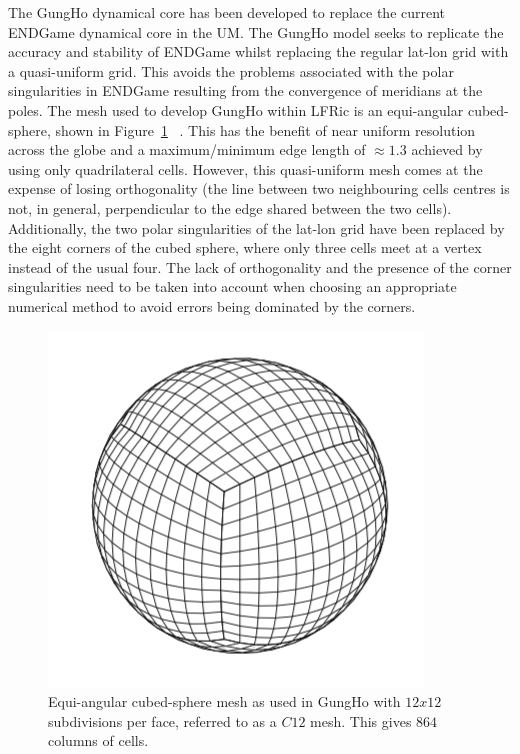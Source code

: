 \documentclass[review,times]{elsarticle}
\begin{document}
The GungHo dynamical core has been developed to replace the current ENDGame
dynamical core in the UM. The GungHo model seeks to replicate the
accuracy and stability of ENDGame whilst replacing the regular lat-lon
grid with a quasi-uniform grid. This avoids the problems associated
with the polar singularities in ENDGame resulting from the
convergence of meridians at the poles. The mesh used to develop GungHo
within LFRic is an equi-angular cubed-sphere, shown in Figure~\ref{fig:cubed-sphere}
~\cite{NairEtal2005}. This has the benefit of near uniform 
resolution across the globe and a maximum/minimum edge length of
$\approx 1.3$ achieved by using only quadrilateral cells.  However,
this quasi-uniform mesh comes at the expense of losing orthogonality
(the line between two neighbouring cells centres is not, in general,
perpendicular to the edge shared between the two cells). Additionally,
the two polar singularities of the lat-lon grid have been replaced by
the eight corners of the cubed sphere, where only three cells meet at a
vertex instead of the usual four. The lack of orthogonality and the
presence of the corner singularities need to be taken into account when
choosing an appropriate numerical method to avoid errors being dominated
by the corners.

\begin{figure}[ht]
\centering\includegraphics[width=0.6\linewidth]{Fig1_Cubed_Sphere.png}
\caption{\label{fig:cubed-sphere} Equi-angular cubed-sphere mesh as
used in GungHo with $12x12$ subdivisions per face, 
referred to as a $C12$ mesh. This gives $864$ columns of cells.}
\end{figure}
%
\end{document}
